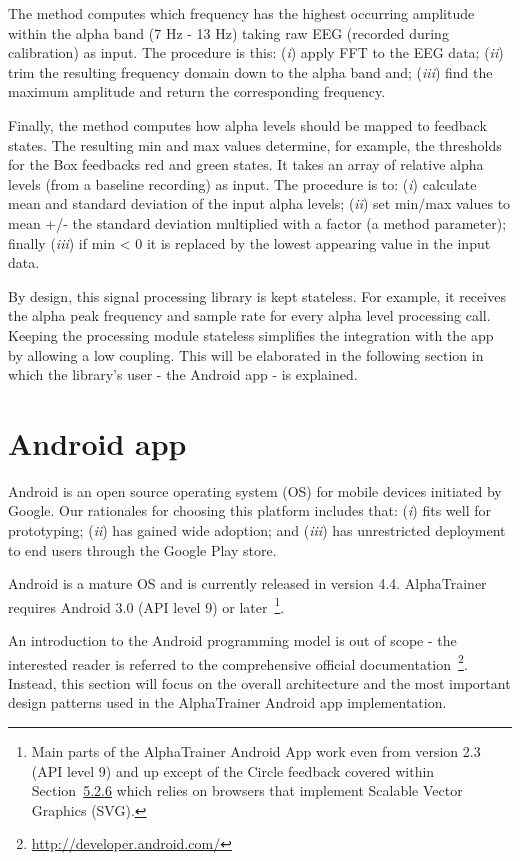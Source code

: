 \documentclass[a4paper,10pt,english,lof,lot,twoside]{puthesis}
\begin{document}
The  method computes which frequency has the highest occurring
amplitude within the alpha band (7 Hz - 13 Hz) taking raw EEG (recorded during
calibration) as input. The procedure is this: (\emph{i}) apply FFT to the EEG data;
(\emph{ii}) trim the resulting frequency domain down to the alpha band and; (\emph{iii}) find
the maximum amplitude and return the corresponding frequency.

Finally, the method  computes how alpha levels should be mapped
to feedback states.  The resulting min and max values determine, for example,
the thresholds for the Box feedbacks red and green states. It takes an array of
relative alpha levels (from a baseline recording) as input. The procedure is to:
(\emph{i}) calculate mean and standard deviation of the input alpha levels; (\emph{ii})
set min/max values to mean +/- the standard deviation multiplied with a factor
(a method parameter); finally (\emph{iii}) if min \textless{} 0 it is replaced by the lowest
appearing value in the input data.

By design, this signal processing library is kept stateless. For example, it
receives the alpha peak frequency and sample rate for every alpha level
processing call. Keeping the processing module stateless simplifies the
integration with the app by allowing a low coupling. This will be elaborated in
the following section in which the library's user - the Android app - is
explained.


\section{Android app}
\label{ch-implementation/index:android-app}
Android is an open source operating system (OS) for mobile devices initiated by
Google. Our rationales for choosing
this platform includes that: (\emph{i}) fits well for prototyping; (\emph{ii}) has gained wide
adoption; and (\emph{iii}) has unrestricted deployment to end users through the Google Play store.

Android is a mature OS and is currently released in version 4.4. AlphaTrainer
requires Android 3.0 (API level 9) or later \footnote{
Main parts of the AlphaTrainer Android App work even from version
2.3 (API level 9) and up except of the Circle feedback covered within Section {\hyperref[ch-implementation/index:ch-implementation-feedback-ui-s]{5.2.6}}
which relies on browsers that implement Scalable Vector Graphics (SVG).
}.

An introduction to the Android programming model is out of scope - the interested reader
is referred to the comprehensive official documentation \footnote{
\href{http://developer.android.com/}{http://developer.android.com/}
}.
Instead, this section will focus on the overall architecture and the most important design patterns
used in the AlphaTrainer Android app implementation.
\end{document}
